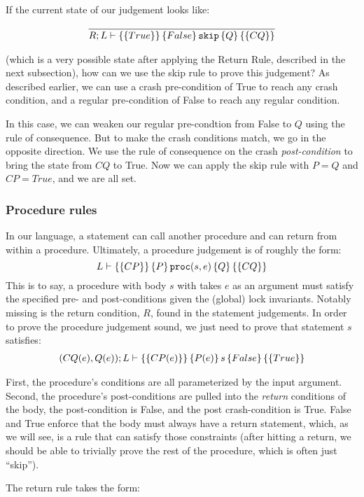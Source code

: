 If the current state of our judgement looks like:

\begin{gather*}
\infer{\hoarestmt{R}{L}{True}{False}{\texttt{skip}}{Q}{CQ}}{}
\end{gather*}

(which is a very possible state after applying the Return Rule, described in the
next subsection), how can we use the skip rule to prove this judgement? As
described earlier, we can use a crash pre-condition of True to reach any crash
condition, and a regular pre-condition of False to reach any regular condition.

In this case, we can weaken our regular pre-condtion from False to $Q$
using the rule of consequence.
But to make the crash conditions match, we go in
the opposite direction.
We use the rule of consequence on the crash
\textit{post-condition} to bring the state from $CQ$ to True.
Now we can apply
the skip rule with $P=Q$ and $CP=True$, and we are all set.

\subsubsection{Procedure rules}

In our language, a statement can call another procedure and can return from
within a procedure.
Ultimately, a procedure judgement is of roughly the form:
$$L \vdash \left\{\left\{ CP \right\}\right\} \left\{ P \right\} \texttt{proc}(s, e) \left\{ Q \right\} \left\{\left\{ CQ \right\}\right\}$$
This is to say, a procedure with body $s$ with takes $e$ as an argument must
satisfy the specified pre- and post-conditions given the (global) lock
invariants.
Notably missing is the return condition, $R$, found in the statement
judgements.
In order to prove the procedure judgement sound, we just need to
prove that statement $s$ satisfies:
\begin{gather*}
(CQ(e),Q(e)); L \vdash \left\{\left\{ CP(e) \right\}\right\} \left\{ P(e) \right\} s \left\{ False \right\} \left\{\left\{ True \right\}\right\}
\end{gather*}

First, the procedure's conditions are all parameterized by the input argument.
Second, the procedure's post-conditions are pulled into the \textit{return}
conditions of the body, the post-condition is False, and the post
crash-condition is True.
False and True enforce that the body must always have a
return statement, which, as we will see, is a rule that can satisfy those
constraints (after hitting a return, we should be able to trivially prove the
rest of the procedure, which is often just ``skip'').

The return rule takes the form:

